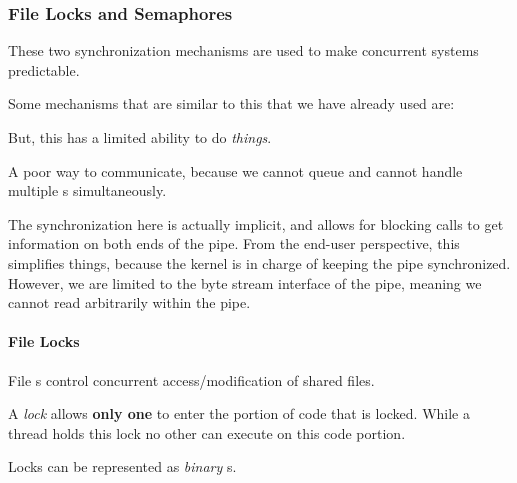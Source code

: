 \subsubsection{File Locks and Semaphores}\label{subsubsec:IPC_Mechanism-File_Locks_Semaphores}
These two synchronization mechanisms are used to make concurrent systems predictable.

Some mechanisms that are similar to this that we have already used are:
\begin{description}[noitemsep]
\item[\cinline{wait}] But, this has a limited ability to do \textit{things}.
\item[\cinline{kill} and \cinline{signal}] A poor way to communicate, because we cannot queue and cannot handle multiple s simultaneously.
\item[Pipes] The synchronization here is actually implicit, and allows for blocking calls to get information on both ends of the pipe.
  From the end-user perspective, this simplifies things, because the kernel is in charge of keeping the pipe synchronized.
  However, we are limited to the byte stream interface of the pipe, meaning we cannot read arbitrarily within the pipe.
\end{description}

\paragraph{File Locks}\label{par:File_Locks}
File s control concurrent access/modification of shared files.
\begin{definition}[Lock]\label{def:Lock}
  A \emph{lock} allows \textbf{only one}  to enter the portion of code that is locked.
  While a thread holds this lock no other  can execute on this code portion.

  \begin{remark}\label{rmk:Binary_Semaphore}
    Locks can be represented as \emph{binary }s.
  \end{remark}
\end{definition}

